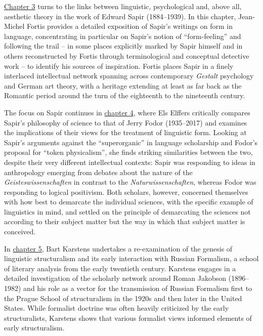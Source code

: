 \documentclass[output=paper]{langscibook}
\begin{document}
\hyperref[chap:fortis]{Chapter 3} turns to the links between linguistic, psychological and, above all, aesthetic theory in the work of Edward Sapir (1884–1939). In this chapter, Jean-Michel Fortis provides a detailed exposition of Sapir's writings on form in language, concentrating in particular on Sapir's notion of ``form-feeling'' and following the trail – in some places explicitly marked by Sapir himself and in others reconstructed by Fortis through terminological and conceptual detective work – to identify his sources of inspiration. Fortis places Sapir in a finely interlaced intellectual network spanning across contemporary \emph{Gestalt} psychology and German art theory, with a heritage extending at least as far back as the Romantic period around the turn of the eighteenth to the nineteenth century.

The focus on Sapir continues in \hyperref[chap:elffers]{chapter 4}, where Els Elffers critically compares Sapir's philosophy of science to that of Jerry Fodor (1935–2017) and examines the implications of their views for the treatment of linguistic form. Looking at Sapir's arguments against the ``superorganic'' in language scholarship and Fodor's proposal for ``token physicalism'', she finds striking similarities between the two, despite their very different intellectual contexts: Sapir was responding to ideas in anthropology emerging from debates about the nature of the \emph{Geisteswissenschaften} in contrast to the \emph{Naturwissenschaften}, whereas Fodor was responding to logical positivism. Both scholars, however, concerned themselves with how best to demarcate the individual sciences, with the specific example of linguistics in mind, and settled on the principle of demarcating the sciences not according to their subject matter but the way in which that subject matter is conceived.

In \hyperref[chap:karstens]{chapter 5}, Bart Karstens undertakes a re-examination of the genesis of linguistic structuralism and its early interaction with Russian Formalism, a school of literary analysis from the early twentieth century. Karstens engages in a detailed investigation of the scholarly network around Roman Jakobson (1896–1982) and his role as a vector for the transmission of Russian Formalism first to the Prague School of structuralism in the 1920s and then later in the United States. While formalist doctrine was often heavily criticized by the early structuralists, Karstens shows that various formalist views informed elements of early structuralism.
\end{document}
